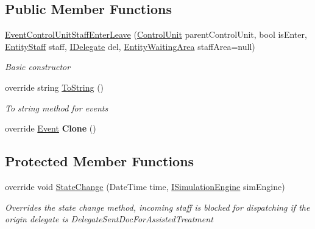 \subsection*{Public Member Functions}
\begin{DoxyCompactItemize}
\item 
\hyperlink{class_general_health_care_elements_1_1_events_1_1_event_control_unit_staff_enter_leave_af5867ad0c999a595cd24ad34cd5029a7}{Event\+Control\+Unit\+Staff\+Enter\+Leave} (\hyperlink{class_simulation_core_1_1_h_c_c_m_elements_1_1_control_unit}{Control\+Unit} parent\+Control\+Unit, bool is\+Enter, \hyperlink{class_simulation_core_1_1_h_c_c_m_elements_1_1_entity_staff}{Entity\+Staff} staff, \hyperlink{interface_simulation_core_1_1_h_c_c_m_elements_1_1_i_delegate}{I\+Delegate} del, \hyperlink{class_general_health_care_elements_1_1_entities_1_1_entity_waiting_area}{Entity\+Waiting\+Area} staff\+Area=null)
\begin{DoxyCompactList}\small\item\em Basic constructor \end{DoxyCompactList}\item 
override string \hyperlink{class_general_health_care_elements_1_1_events_1_1_event_control_unit_staff_enter_leave_a3d7634f456bb34a226ee1d2a7fce129a}{To\+String} ()
\begin{DoxyCompactList}\small\item\em To string method for events \end{DoxyCompactList}\item 
override \hyperlink{class_simulation_core_1_1_h_c_c_m_elements_1_1_event}{Event} {\bfseries Clone} ()\hypertarget{class_general_health_care_elements_1_1_events_1_1_event_control_unit_staff_enter_leave_a01e46b0d357352528301300f3970a15a}{}\label{class_general_health_care_elements_1_1_events_1_1_event_control_unit_staff_enter_leave_a01e46b0d357352528301300f3970a15a}

\end{DoxyCompactItemize}
\subsection*{Protected Member Functions}
\begin{DoxyCompactItemize}
\item 
override void \hyperlink{class_general_health_care_elements_1_1_events_1_1_event_control_unit_staff_enter_leave_aef4d568a855094fc81c6103b310173de}{State\+Change} (Date\+Time time, \hyperlink{interface_simulation_core_1_1_simulation_classes_1_1_i_simulation_engine}{I\+Simulation\+Engine} sim\+Engine)
\begin{DoxyCompactList}\small\item\em Overrides the state change method, incoming staff is blocked for dispatching if the origin delegate is Delegate\+Sent\+Doc\+For\+Assisted\+Treatment \end{DoxyCompactList}\end{DoxyCompactItemize}
